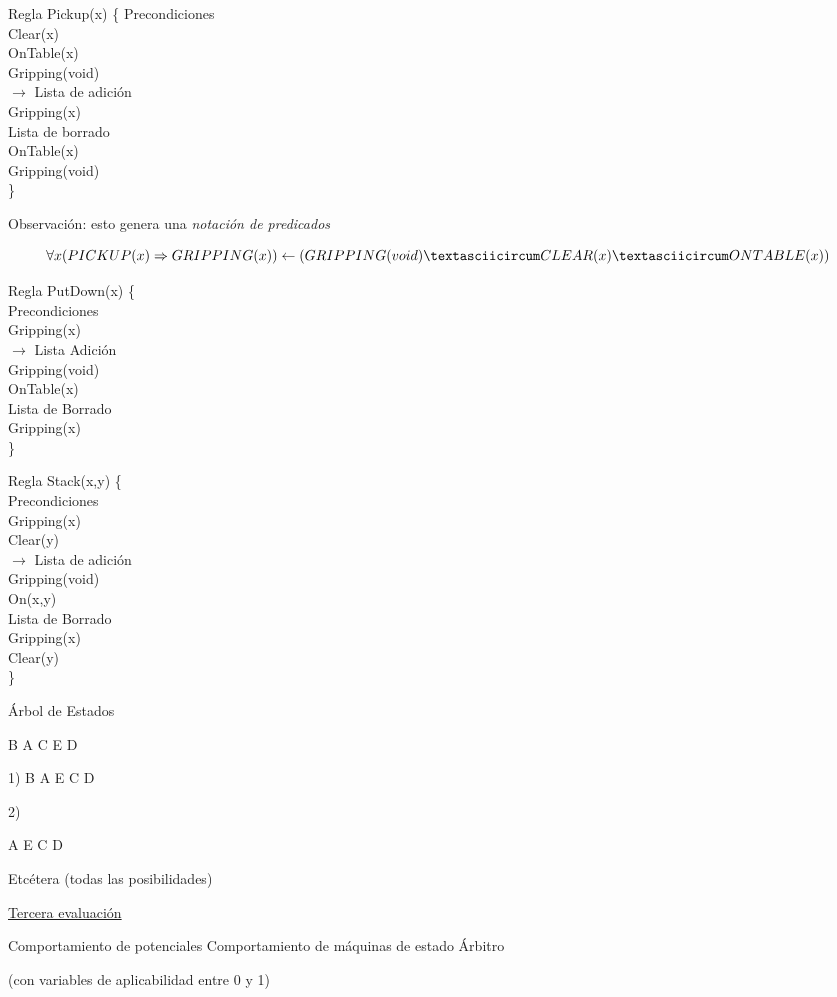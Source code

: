 Regla Pickup(x) \{
	Precondiciones \\
	Clear(x) \\
	OnTable(x) \\
	Gripping(void) \\
$\rightarrow$
	Lista de adición \\
	Gripping(x) \\ 
	Lista de borrado \\
	OnTable(x) \\
	Gripping(void) \\
\}


Observación: esto genera una \textit{notación de predicados}
 
$$ \forall x (PICKUP (x) \Rightarrow GRIPPING (x)) \leftarrow (GRIPPING (void) \textasciicircum CLEAR (x) \textasciicircum ONTABLE (x))
$$

Regla PutDown(x) \{ \\
	Precondiciones \\
	Gripping(x) \\
	$\rightarrow$
	Lista Adición \\
	Gripping(void) \\
	OnTable(x) \\
	Lista de Borrado \\
	Gripping(x) \\
\}

Regla Stack(x,y) \{ \\
	Precondiciones \\
	Gripping(x) \\
	Clear(y) \\
	$\rightarrow$ 
	Lista de adición \\
	Gripping(void) \\
	On(x,y) \\
	Lista de Borrado \\
	Gripping(x) \\
	Clear(y) \\
\}

Árbol de Estados

B A
C E
D


1) B
A E
C D

2)


A E
C D


Etcétera (todas las posibilidades)

\underline{Tercera evaluación}

Comportamiento de potenciales
Comportamiento de máquinas de estado
Árbitro


(con variables de aplicabilidad entre 0 y 1)




